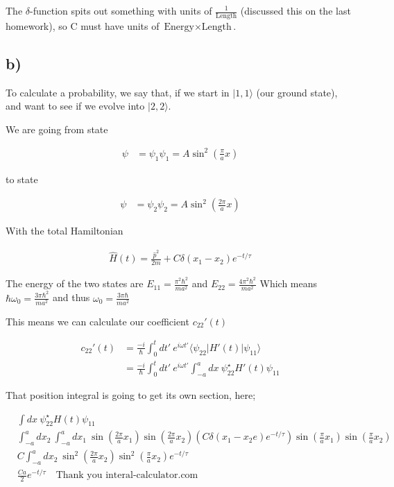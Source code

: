 \documentclass{article}
\newcommand{\p}[1]{\left(#1\right)}
\newcommand{\braket}[1]{\langle#1\rangle}
\newcommand{\bra}[1]{|#1\rangle}
\begin{document}
The $\delta$-function spits out something with units of $\frac{1}{\text{Length}}$ (discussed this on the last homework), so C must have units of $\text{Energy}\times\text{Length}$.

\subsection*{b)}

To calculate a probability, we say that, if we start in $\bra{1,1}$ (our ground state), and want to see if we evolve into $\bra{2, 2}$.

We are going from state

\begin{align*}
    \psi&=\psi_1\psi_1=A\sin^2\p{\frac{\pi}{a}x}
\end{align*}

to state

\begin{align*}
    \psi&=\psi_2\psi_2=A\sin^2\p{\frac{2\pi}{a}x}
\end{align*}

With the total Hamiltonian

\begin{align*}
    \hat{H}(t)=\frac{\hat{p}^2}{2m}+C\delta(x_1-x_2)e^{-t/\tau}
\end{align*}

The energy of the two states are $E_{11}=\frac{\pi^2\hbar^2}{ma^2}$ and $E_{22}=\frac{4\pi^2\hbar^2}{ma^2}$ Which means $\hbar\omega_0=\frac{3\pi\hbar^2}{ma^2}$ and thus $\omega_0=\frac{3\pi\hbar}{ma^2}$

This means we can calculate our coefficient $c_{22}'(t)$

\begin{align*}
    c_{22}'(t)&=\frac{-i}{\hbar}\int_{0}^{t}dt'\:e^{i\omega{t'}}\braket{\psi_{22}|H'(t)|\psi_{11}}\\[1em]
    &=\frac{-i}{\hbar}\int_{0}^{t}dt'\:e^{i\omega{t'}}\int_{-a}^{a}dx\:\psi_{22}^{\star}H'(t)\psi_{11}
\end{align*}

That position integral is going to get its own section, here;


\begin{align*}
    &\int{dx}\:\psi_{22}^{\star}H(t)\psi_{11}\\[1em]
    &\int_{-a}^{a}dx_{2}\:\int_{-a}^{a}dx_{1}\:\sin(\frac{2\pi}{a}x_1)\sin(\frac{2\pi}{a}x_2)\p{C\delta(x_1-x_2e)e^{-t/\tau}}\sin(\frac{\pi}{a}x_1)\sin(\frac{\pi}{a}x_2)\\[1em]
    &C\int_{-a}^{a}dx_{2}\:\sin^2(\frac{2\pi}{a}x_2)\sin^2(\frac{\pi}{a}x_2)e^{-t/\tau}\\[1em]
    &\frac{Ca}{2}e^{-t/\tau}\quad\text{Thank you interal-calculator.com}
\end{align*}
\end{document}

